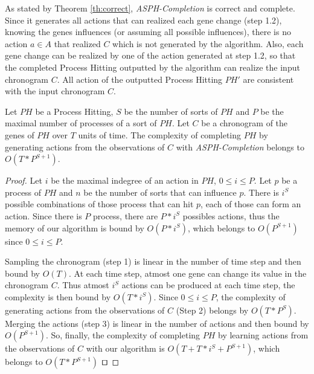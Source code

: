 	As stated by Theorem \ref{th:correct}, {\it ASPH-Completion} is correct and complete.
	Since it generates all actions that can realized each gene change (step 1.2),
	knowing the genes influences (or assuming all possible influences),
	there is no action $a \in A$ that realized $C$ which is not generated by the algorithm.
	Also, each gene change can be realized by one of the action generated at step 1.2,
	so that the completed Process Hitting outputted by the algorithm can realize the input chronogram $C$.
	All action of the outputted Process Hitting $PH'$ are consistent with the input chronogram $C$.

\begin{theorem}[Complexity]
	\label{th:complexity}
	Let $PH$ be a Process Hitting, $S$ be the number of sorts of $PH$ and $P$ be the maximal number of processes of a sort of $PH$.
	Let $C$ be a chronogram of the genes of $PH$ over $T$ units of time.
	The complexity of completing $PH$ by generating actions from the observations of $C$ with {\it ASPH-Completion} belongs to $O(T*P^{S+1})$.
	\begin{proof}
		Let $i$ be the maximal indegree of an action in $PH$, $0 \leq i \leq P$.
		Let $p$ be a process of $PH$ and $n$ be the number of sorts that can influence $p$.
		There is $i^S$ possible combinations of those process that can hit $p$, each of those can form an action.
		Since there is $P$ process, there are $P * i^S$ possibles actions, thus the memory of our algorithm is bound by $O(P * i^S)$,
		which belongs to $O(P^{S+1})$ since $0 \leq i \leq P$.
	
		Sampling the chronogram (step 1) is linear in the number of time step and then bound by $O(T)$.
		At each time step, atmost one gene can change its value in the chronogram $C$.
		Thus atmost $i^S$ actions can be produced at each time step, the complexity is then bound by $O(T * i^S)$.
		Since $0 \leq i \leq P$, the complexity of generating actions from the observations of $C$ (Step 2) belongs by $O(T * P^S)$.
		Merging the actions (step 3) is linear in the number of actions and then bound by $O(P^{S+1})$.
		So, finally, the complexity of completing $PH$ by learning actions from the observations of $C$ with our algorithm is $O(T + T * i^S + P^{S+1})$,
		which belongs to $O(T * P^{S+1})$
		$\qed$
	\end{proof}
\end{theorem}



